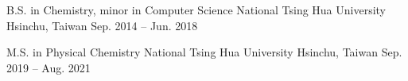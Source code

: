


\begin{cventries}


\cventrynodiscription
{B.S. in Chemistry, minor in Computer Science} %
{National Tsing Hua University} %
{Hsinchu, Taiwan} %
{Sep. 2014 -- Jun. 2018}


\cventrynodiscription
{M.S. in Physical Chemistry}
{National Tsing Hua University}
{Hsinchu, Taiwan}
{Sep. 2019 -- Aug. 2021}


\end{cventries}
